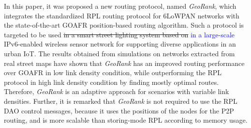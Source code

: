 \documentclass[final,authoryear,3p,twocolumn]{elsarticle}
\newcommand{\rev}{\textcolor{blue}}
\begin{document}
In this paper, it was proposed a new routing protocol, named \textit{GeoRank}, which integrates the standardized RPL routing protocol for 6LoWPAN networks with the state-of-the-art GOAFR position-based routing algorithm. 
Such a protocol is targeted to be used \sout{in a smart street lighting system based on} \rev{in a large-scale} IPv6-enabled wireless sensor network for supporting diverse applications in an urban IoT. The results obtained from simulations on networks extracted from real street maps have shown that \textit{GeoRank} has an improved routing performance over GOAFR in low link density condition, while outperforming the RPL protocol in high link density condition by finding mostly optimal routes. Therefore, \textit{GeoRank} is an adaptive approach for scenarios with variable link densities. Further, it is remarked that \textit{GeoRank} is not required to use the RPL DAO control messages, because it uses the positions of the nodes for the P2P routing, and is more scalable than storing-mode RPL according to memory usage. 
	
%




\end{document}
